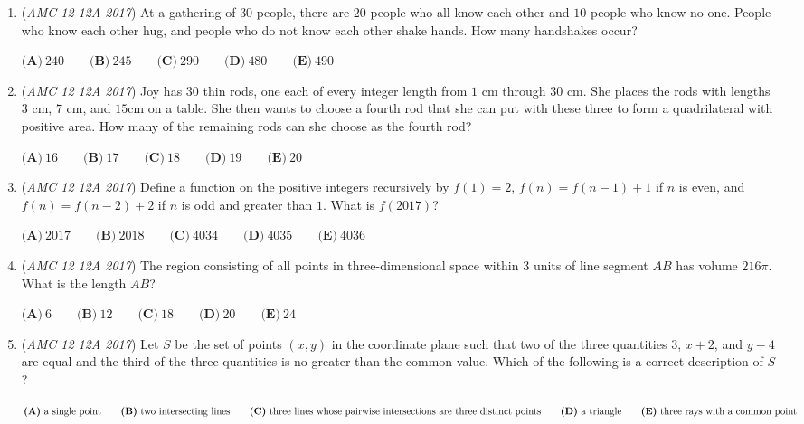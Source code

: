 \begin{enumerate}
 $\textbf{(A)}\ 30\%\qquad\textbf{(B)}\ 40\%\qquad\textbf{(C)}\ 50\%\qquad\textbf{(D)}\ 60\%\qquad\textbf{(E)}\ 70\%$


	\item (\textit{AMC 12 12A 2017}) At a gathering of $30$ people, there are $20$ people who all know each other and $10$ people who know no one. People who know each other hug, and people who do not know each other shake hands. How many handshakes occur?


 $\textbf{(A)}\ 240\qquad\textbf{(B)}\ 245\qquad\textbf{(C)}\ 290\qquad\textbf{(D)}\ 480\qquad\textbf{(E)}\ 490$


	\item (\textit{AMC 12 12A 2017}) Joy has $30$ thin rods, one each of every integer length from $1 \text{ cm}$ through $30 \text{ cm}$. She places the rods with lengths $3 \text{ cm}$, $7 \text{ cm}$, and $15 \text{cm}$ on a table. She then wants to choose a fourth rod that she can put with these three to form a quadrilateral with positive area. How many of the remaining rods can she choose as the fourth rod?


 $\textbf{(A)}\ 16 \qquad\textbf{(B)}\ 17 \qquad\textbf{(C)}\ 18 \qquad\textbf{(D)}\ 19  \qquad\textbf{(E)}\ 20$


	\item (\textit{AMC 12 12A 2017}) Define a function on the positive integers recursively by $f(1) = 2$, $f(n) = f(n-1) + 1$ if $n$ is even, and $f(n) = f(n-2) + 2$ if $n$ is odd and greater than $1$. What is $f(2017)$?


 $\textbf{(A)}\ 2017 \qquad\textbf{(B)}\ 2018 \qquad\textbf{(C)}\ 4034 \qquad\textbf{(D)}\ 4035 \qquad\textbf{(E)}\ 4036$


	\item (\textit{AMC 12 12A 2017}) The region consisting of all points in three-dimensional space within $3$ units of line segment $\overline{AB}$ has volume $216 \pi$. What is the length $AB$?


 $\textbf{(A)}\ 6 \qquad\textbf{(B)}\ 12 \qquad\textbf{(C)}\ 18 \qquad\textbf{(D)}\ 20 \qquad\textbf{(E)}\ 24$


	\item (\textit{AMC 12 12A 2017}) Let $S$ be the set of points $(x,y)$ in the coordinate plane such that two of the three quantities $3$, $x+2$, and $y-4$ are equal and the third of the three quantities is no greater than the common value. Which of the following is a correct description of $S$?


 $\textbf{(A)}\ \text{a single point} \qquad\textbf{(B)}\ \text{two intersecting lines} \\ \qquad\textbf{(C)}\ \text{three lines whose pairwise intersections are three distinct points} \\ \qquad\textbf{(D)}\ \text{a triangle}\qquad\textbf{(E)}\ \text{three rays with a common point}$



\end{enumerate}
